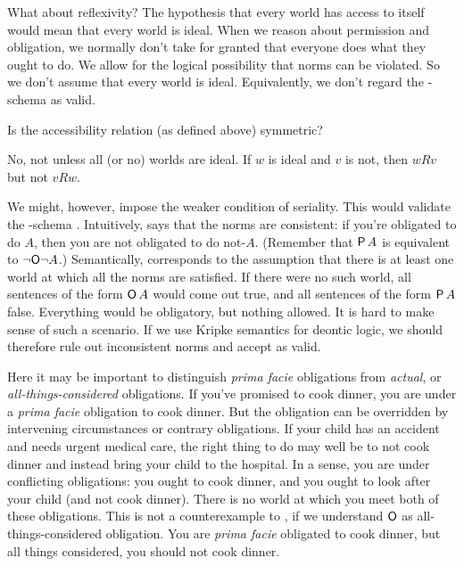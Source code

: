 What about reflexivity? The hypothesis that every world has access to itself
would mean that every world is ideal. When we reason about permission and
obligation, we normally don't take for granted that everyone does what they
ought to do. We allow for the logical possibility that norms can be violated. So
we don't assume that every world is ideal. Equivalently, we don't regard the
-schema
%
%
as valid.

\begin{exercise}
  Is the accessibility relation (as defined above) symmetric?
\end{exercise}
\begin{solution}
  No, not unless all (or no) worlds are ideal. If $w$ is ideal and $v$ is not,
  then $wRv$ but not $vRw$.
\end{solution}

We might, however, impose the weaker condition of seriality. This would
validate the -schema
%
.
%
Intuitively,  says that the norms are consistent: if you're obligated to
do $A$, then you are not obligated to do not-$A$. (Remember that $\operatorname{\mathsf{P}} A$ is
equivalent to $\neg\! \operatorname{\mathsf{O}}\! \neg A$.) Semantically,  corresponds to the
assumption that there is at least one world at which all the norms are
satisfied. If there were no such world, all sentences of the form $\operatorname{\mathsf{O}} A$ would
come out true, and all sentences of the form $\operatorname{\mathsf{P}} A$ false. Everything would be
obligatory, but nothing allowed. It is hard to make sense of such a scenario. If
we use Kripke semantics for deontic logic, we should therefore rule out
inconsistent norms and accept  as valid.

Here it may be important to distinguish \emph{prima facie} obligations from
\emph{actual}, or \emph{all-things-considered} obligations. If you've promised
to cook dinner, you are under a \emph{prima facie} obligation to cook dinner.
But the obligation can be overridden by intervening circumstances or contrary
obligations. If your child has an accident and needs urgent medical care, the
right thing to do may well be to not cook dinner and instead bring your child to
the hospital. In a sense, you are under conflicting obligations: you ought to
cook dinner, and you ought to look after your child (and not cook dinner). There
is no world at which you meet both of these obligations. This is not a
counterexample to , if we understand $\operatorname{\mathsf{O}}$ as all-things-considered
obligation. You are \emph{prima facie} obligated to cook dinner, but all things
considered, you should not cook dinner.

